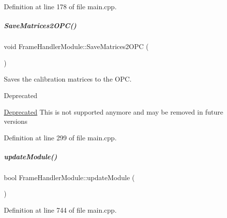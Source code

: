 Definition at line 178 of file main.\+cpp.

\mbox{\label{group__referenceFrameHandler_a2118efdc6d55910b8fcbbf3b4fb9de10}} 
\subparagraph{\texorpdfstring{Save\+Matrices2\+O\+P\+C()}{SaveMatrices2OPC()}}
{\footnotesize\ttfamily void Frame\+Handler\+Module\+::\+Save\+Matrices2\+O\+PC (\begin{DoxyParamCaption}{ }\end{DoxyParamCaption})\hspace{0.3cm}{\ttfamily [inline]}}



Saves the calibration matrices to the O\+PC. 

\begin{DoxyRefDesc}{Deprecated}
\item[\hyperlink{deprecated__deprecated000002}{Deprecated}]This is not supported anymore and may be removed in future versions \end{DoxyRefDesc}


Definition at line 299 of file main.\+cpp.

\mbox{\label{group__referenceFrameHandler_a123d9f8aa941484862ed502f752653f9}} 
\subparagraph{\texorpdfstring{update\+Module()}{updateModule()}}
{\footnotesize\ttfamily bool Frame\+Handler\+Module\+::update\+Module (\begin{DoxyParamCaption}{ }\end{DoxyParamCaption})\hspace{0.3cm}{\ttfamily [inline]}}



Definition at line 744 of file main.\+cpp.

